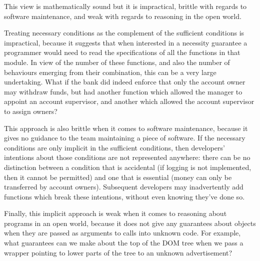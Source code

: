 This view is mathematically sound but it is impractical, brittle with
regards to software maintenance, and weak with regards to reasoning in
the open world.


Treating necessary conditions as the complement of the sufficient
conditions is impractical, because it suggests that when interested in
a necessity guarantee a programmer would need to read the
specifications of all the functions in that module.  In view of the
number of these functions, and also the number of behaviours emerging
from their combination, this can be a very large undertaking.  What if
the bank did indeed enforce that only the account owner may withdraw
funds, but had another function which allowed the manager to appoint
an account supervisor, and another which allowed the account
supervisor to assign owners?

This approach is also brittle when it comes to software maintenance,
because it gives no guidance to the team maintaining a piece of
software.  If the necessary conditions are only implicit in the
sufficient conditions, then developers' intentions about those
conditions are not represented anywhere: there can be no distinction
between a condition that is accidental (if logging is not
implemented, then it cannot be permitted) and one that is essential
(money can only be transferred by account owners).
Subsequent developers may inadvertently add functions which break these
intentions, without even knowing they've done so.

Finally, this implicit approach is weak when it comes to reasoning
about programs in an open world, because it does not give any
guarantees about objects when they are passed as arguments to calls
into unknown code. For example, what guarantees can we make about the
top of the DOM tree when we pass a wrapper pointing to lower parts of
the tree to an unknown advertisement?
